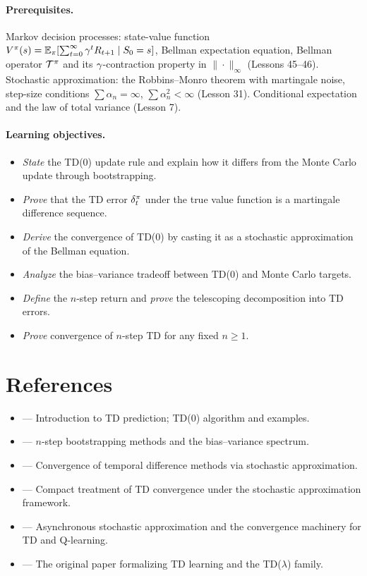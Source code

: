 \documentclass[11pt,a4paper]{article}
\begin{document}
\paragraph{Prerequisites.}
Markov decision processes: state-value function $V^{\pi}(s) =
\mathbb{E}_\pi[\sum_{t=0}^\infty \gamma^t R_{t+1} \mid S_0 = s]$,
Bellman expectation equation, Bellman operator $\mathcal{T}^\pi$ and its
$\gamma$-contraction property in $\|\cdot\|_\infty$ (Lessons 45--46).
Stochastic approximation: the Robbins--Monro theorem with martingale
noise, step-size conditions $\sum \alpha_n = \infty$,
$\sum \alpha_n^2 < \infty$ (Lesson 31). Conditional expectation and the
law of total variance (Lesson 7).

\paragraph{Learning objectives.}
\begin{itemize}
  \item \emph{State} the TD(0) update rule and explain how it differs
    from the Monte Carlo update through bootstrapping.
  \item \emph{Prove} that the TD error $\delta_t^\pi$ under the true
    value function is a martingale difference sequence.
  \item \emph{Derive} the convergence of TD(0) by casting it as a
    stochastic approximation of the Bellman equation.
  \item \emph{Analyze} the bias--variance tradeoff between TD(0) and
    Monte Carlo targets.
  \item \emph{Define} the $n$-step return and \emph{prove} the
    telescoping decomposition into TD errors.
  \item \emph{Prove} convergence of $n$-step TD for any fixed $n \geq 1$.
\end{itemize}

\section{References}
\label{sec:references}

\begin{itemize}[leftmargin=2em]
  \item \citet[Chapter 6]{suttonbarto2018} --- Introduction to TD
    prediction; TD(0) algorithm and examples.
  \item \citet[Chapter 7]{suttonbarto2018} --- $n$-step bootstrapping
    methods and the bias--variance spectrum.
  \item \citet[Chapter 4]{bertsekas1996} --- Convergence of temporal
    difference methods via stochastic approximation.
  \item \citet[Section 4]{szepesvari2010} --- Compact treatment of TD
    convergence under the stochastic approximation framework.
  \item \citet{tsitsiklis1994} --- Asynchronous stochastic approximation
    and the convergence machinery for TD and Q-learning.
  \item \citet{sutton1988} --- The original paper formalizing TD learning
    and the TD($\lambda$) family.
\end{itemize}
\end{document}
